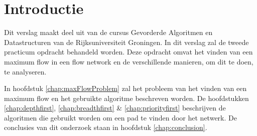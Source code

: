 \chapter{Introductie}

Dit verslag maakt deel uit van de cursus Gevorderde Algoritmen en Datastructuren van de Rijksuniversiteit Groningen. 
In dit verslag zal de tweede practicum opdracht behandeld worden. 
Deze opdracht omvat het vinden van een maximum flow in een flow network en de verschillende manieren, om dit te doen, te analyseren.

In hoofdstuk \ref{chap:maxFlowProblem} zal het probleem van het vinden van een maximum flow en het gebruikte algoritme beschreven worden. De hoofdstukken \ref{chap:depthfirst}, \ref{chap:breadthfirst} \& \ref{chap:priorityfirst} beschrijven de algoritmen die gebruikt worden om een pad te vinden door het netwerk. De conclusies van dit onderzoek staan in hoofdstuk \ref{chap:conclusion}.